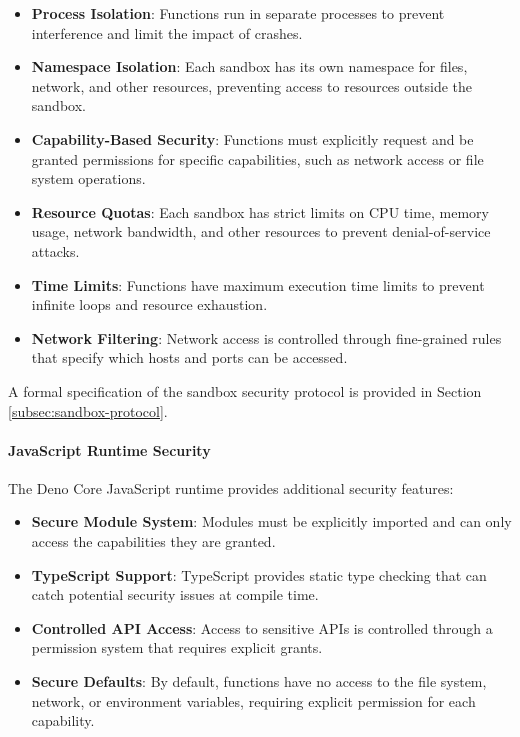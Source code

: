 \begin{itemize}
    \item \textbf{Process Isolation}: Functions run in separate processes to prevent interference and limit the impact of crashes.
    
    \item \textbf{Namespace Isolation}: Each sandbox has its own namespace for files, network, and other resources, preventing access to resources outside the sandbox.
    
    \item \textbf{Capability-Based Security}: Functions must explicitly request and be granted permissions for specific capabilities, such as network access or file system operations.
    
    \item \textbf{Resource Quotas}: Each sandbox has strict limits on CPU time, memory usage, network bandwidth, and other resources to prevent denial-of-service attacks.
    
    \item \textbf{Time Limits}: Functions have maximum execution time limits to prevent infinite loops and resource exhaustion.
    
    \item \textbf{Network Filtering}: Network access is controlled through fine-grained rules that specify which hosts and ports can be accessed.
\end{itemize}

A formal specification of the sandbox security protocol is provided in Section \ref{subsec:sandbox-protocol}.



\paragraph{JavaScript Runtime Security}
The Deno Core JavaScript runtime provides additional security features:

\begin{itemize}
    \item \textbf{Secure Module System}: Modules must be explicitly imported and can only access the capabilities they are granted.
    
    \item \textbf{TypeScript Support}: TypeScript provides static type checking that can catch potential security issues at compile time.
    
    \item \textbf{Controlled API Access}: Access to sensitive APIs is controlled through a permission system that requires explicit grants.
    
    \item \textbf{Secure Defaults}: By default, functions have no access to the file system, network, or environment variables, requiring explicit permission for each capability.
\end{itemize}

